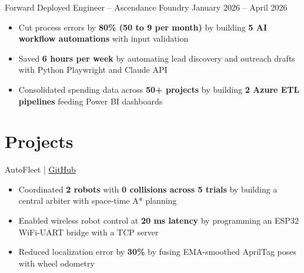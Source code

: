 \documentclass[11pt]{article}       %
\newcommand{\textsb}[1]{{\fontseries{sb}\selectfont #1}}
\begin{document}
\vspace{6pt}

\textsb{Forward Deployed Engineer} -- Ascendance Foundry \hfill January 2026 -- April 2026 \\
\begin{itemize}
    \item Cut process errors by \textbf{80\% (50 to 9 per month)} by building \textbf{5 AI workflow automations} with input validation
    \item Saved \textbf{6 hours per week} by automating lead discovery and outreach drafts with Python Playwright and Claude API
    \item Consolidated spending data across \textbf{50+ projects} by building \textbf{2 Azure ETL pipelines} feeding Power BI dashboards
\end{itemize}



\section*{Projects}

\textsb{AutoFleet} | \href{https://github.com/LegendaryArk/TIC_AutoFleet}{\underline{GitHub}}
\begin{itemize}
    \item Coordinated \textbf{2 robots} with \textbf{0 collisions across 5 trials} by building a central arbiter with space-time A* planning
    \item Enabled wireless robot control at \textbf{20 ms latency} by programming an ESP32 WiFi-UART bridge with a TCP server
    \item Reduced localization error by \textbf{30\%} by fusing EMA-smoothed AprilTag poses with wheel odometry
\end{itemize}
\end{document}
